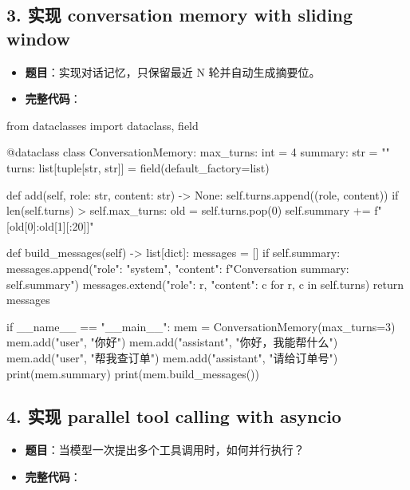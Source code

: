 \subsection{3. 实现 conversation memory with sliding window}
\begin{itemize}[leftmargin=2em]
\item \textbf{题目}：实现对话记忆，只保留最近 N 轮并自动生成摘要位。
\item \textbf{完整代码}：
\end{itemize}

\begin{codeblock}
from dataclasses import dataclass, field


@dataclass
class ConversationMemory:
    max_turns: int = 4
    summary: str = ""
    turns: list[tuple[str, str]] = field(default_factory=list)

    def add(self, role: str, content: str) -> None:
        self.turns.append((role, content))
        if len(self.turns) > self.max_turns:
            old = self.turns.pop(0)
            self.summary += f" [{old[0]}:{old[1][:20]}]"

    def build_messages(self) -> list[dict]:
        messages = []
        if self.summary:
            messages.append({"role": "system", "content": f"Conversation summary: {self.summary}"})
        messages.extend({"role": r, "content": c} for r, c in self.turns)
        return messages


if __name__ == "__main__":
    mem = ConversationMemory(max_turns=3)
    mem.add("user", "你好")
    mem.add("assistant", "你好，我能帮什么")
    mem.add("user", "帮我查订单")
    mem.add("assistant", "请给订单号")
    print(mem.summary)
    print(mem.build_messages())
\end{codeblock}

\subsection{4. 实现 parallel tool calling with asyncio}
\begin{itemize}[leftmargin=2em]
\item \textbf{题目}：当模型一次提出多个工具调用时，如何并行执行？
\item \textbf{完整代码}：
\end{itemize}

